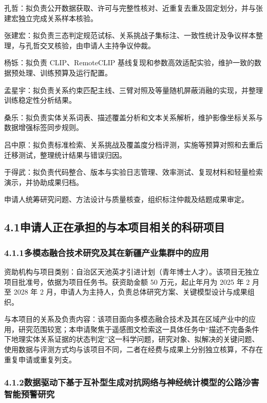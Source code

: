 孔哲：拟负责公开数据获取、许可与完整性核对、近重复去重及固定划分，并与张建宏独立完成关系样本核验。

张建宏：拟负责三态判定规范试标、关系挑战子集标注、一致性统计及争议样本整理，与孔哲交叉核验，由申请人主持争议仲裁。

杨铄：拟负责 CLIP、RemoteCLIP 基线复现和参数高效适配实验，维护一致的数据预处理、训练预算及运行配置。

孟星宇：拟负责关系约束匹配主线、三臂对照及等量随机屏蔽消融的实现，并整理训练稳定性分析结果。

桑乐：拟负责实体关系词表、描述覆盖分析和文本关系解析，维护影像坐标关系与数据增强标签同步规则。

吕中原：拟负责标准检索、关系挑战及覆盖度分档评测，实施等预算对照和去重后迁移测试，整理统计结果与错误归因。

于得武：拟负责代码整合、版本与实验日志管理、效率测试、复现材料和轻量检索演示，并协助成果归档。

申请人统筹研究问题、方法设计与质量核查，组织标注仲裁及结题成果审定。


\subsection*{4.1\quad 申请人正在承担的与本项目相关的科研项目}

\subsubsection*{4.1.1\quad 多模态融合技术研究及其在新疆产业集群中的应用}

资助机构与项目类别：自治区天池英才引进计划（青年博士人才）。该项目无独立项目批准号，依据为项目任务书。获资助金额 50 万元，起止年月为 2025 年 2 月至 2028 年 2 月，申请人为主持人，负责总体研究方案、关键模型设计与成果组织。

与本项目的关系及负责内容：该项目面向多模态融合技术及其在区域产业中的应用，研究范围较宽；本申请聚焦于遥感图文检索这一具体任务中“描述不完备条件下地理实体关系证据的状态判定”这一科学问题，研究对象、拟解决的关键问题、使用数据与评测方式均与该项目不同，二者在经费与成果上分别独立核算，不存在重复申请或重复列支。

\subsubsection*{4.1.2\quad 数据驱动下基于互补型生成对抗网络与神经统计模型的公路沙害智能预警研究}

